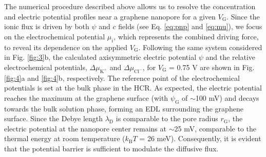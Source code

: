 \documentclass[journal=nalefd,email=true, hyperref=true, keywords=false]{achemso}
\newcommand{\Fig}{Fig.}
\begin{document}
The numerical procedure described above allows us to resolve the
concentration and electric potential profiles near a graphene
nanopore for a given $V_{\mathrm{G}}$. Since the ionic flux is driven
by both $\psi$ and $c$ fields (see Eq. \eqref{eq:pnp} and \eqref{eq:mu}),
we focus on the electrochemical potential $\mu_{i}$, which represents
the combined driving force, to reveal its dependence on the applied
$V_{\mathrm{G}}$. Following the same system considered in \Fig{}
\ref{fig:3}b, the calculated axisymmetric electric potential $\psi$
and the relative electrochemical potentials,
$\Delta \mu_{\mathrm{K^{+}}}$ and $\Delta \mu_{\mathrm{Cl^{-}}}$, for
$V_{\mathrm{G}}$ = 0.75 V are shown in \Fig{} \ref{fig:4}a and
\ref{fig:4}b, respectively. The reference point of the electrochemical
potentials is set at the bulk phase in the HCR. As expected, the
electric potential reaches the maximum at the graphene surface (with
$\psi_{\mathrm{G}}$ of $\sim$100 mV) and decays towards the bulk
solution phase, forming an EDL surrounding the graphene surface. Since
the Debye length $\lambda_{\mathrm{D}}$ is comparable to the
pore radius $r_{\mathrm{G}}$, the electric potential at the nanopore
center remains at $\sim$25 mV, comparable to the thermal energy at
room temperature ($k_{\mathrm{B}}T$ = 26 meV). Consequently, it is
evident that the potential barrier is sufficient to modulate the
diffusive flux.
\end{document}
